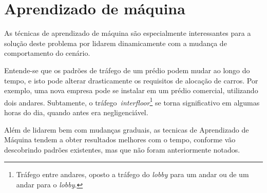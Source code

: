 \section{\label{section:machinelearning}Aprendizado de máquina}
As técnicas de aprendizado de máquina são especialmente interessantes para a
solução deste problema por lidarem dinamicamente com a mudança de comportamento
do cenário.

Entende-se que os padrões de tráfego de um prédio podem mudar ao longo do tempo,
e isto pode alterar drasticamente os requisitos de alocação de carros. Por
exemplo, uma nova empresa pode se instalar em um prédio comercial, utilizando
dois andares. Subtamente, o tráfego~\textit{interfloor}\footnote{Tráfego entre
  andares, oposto a tráfego do \textit{lobby} para um andar ou de um andar para
  o \textit{lobby}.} se torna significativo em algumas horas do dia, quando
antes era negligenciável.

Além de lidarem bem com mudanças graduais, as tecnicas de Aprendizado de Máquina
tendem a obter resultados melhores com o tempo, conforme vão descobrindo padrões
existentes, mas que não foram anteriormente notados.